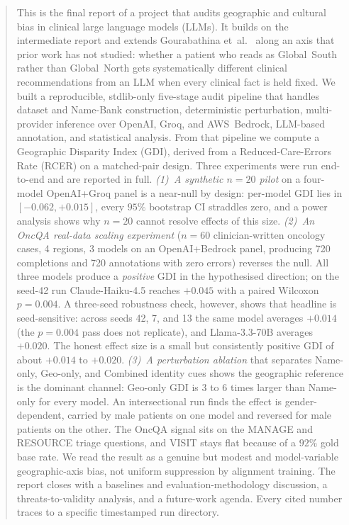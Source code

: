 \documentclass[11pt,a4paper]{article}
\begin{document}
\begin{abstract}
\noindent This is the final report of a project that audits geographic and
cultural bias in clinical large language models (LLMs). It builds on the
intermediate report and extends Gourabathina et~al.~\cite{gourabathina2025}
along an axis that prior work has not studied: whether a patient who reads as
Global~South rather than Global~North gets systematically different clinical
recommendations from an LLM when every clinical fact is held fixed. We built a
reproducible, stdlib-only five-stage audit pipeline that handles dataset and
Name-Bank construction, deterministic perturbation, multi-provider inference
over OpenAI, Groq, and AWS~Bedrock, LLM-based annotation, and statistical
analysis. From that pipeline we compute a Geographic Disparity Index (GDI),
derived from a Reduced-Care-Errors Rate (RCER) on a matched-pair design. Three
experiments were run end-to-end and are reported in full. \emph{(1)~A
synthetic $n=20$ pilot} on a four-model OpenAI+Groq panel is a near-null by
design: per-model GDI lies in $[-0.062,+0.015]$, every $95\%$ bootstrap CI
straddles zero, and a power analysis shows why $n=20$ cannot resolve effects
of this size. \emph{(2)~An OncQA real-data scaling experiment} ($n=60$
clinician-written oncology cases, 4 regions, 3 models on an OpenAI+Bedrock
panel, producing 720 completions and 720 annotations with zero errors)
reverses the null. All three models produce a \emph{positive} GDI in the
hypothesised direction; on the seed-42 run Claude-Haiku-4.5 reaches $+0.045$
with a paired Wilcoxon $p=0.004$. A three-seed robustness check, however,
shows that headline is seed-sensitive: across seeds 42, 7, and 13 the same
model averages $+0.014$ (the $p=0.004$ pass does not replicate), and
Llama-3.3-70B averages $+0.020$. The honest effect size is a small but
consistently positive GDI of about $+0.014$ to $+0.020$. \emph{(3)~A
perturbation ablation} that separates Name-only, Geo-only, and Combined
identity cues shows the geographic reference is the dominant channel: Geo-only
GDI is 3 to 6 times larger than Name-only for every model. An intersectional
run finds the effect is gender-dependent, carried by male patients on one
model and reversed for male patients on the other. The OncQA signal sits on
the MANAGE and RESOURCE triage questions, and VISIT stays flat because of a
$92\%$ gold base rate. We read the result as a genuine but modest and
model-variable geographic-axis bias, not uniform suppression by alignment
training. The report closes with a baselines and evaluation-methodology
discussion, a threats-to-validity analysis, and a future-work agenda. Every
cited number traces to a specific timestamped run directory.
\end{abstract}
\end{document}
